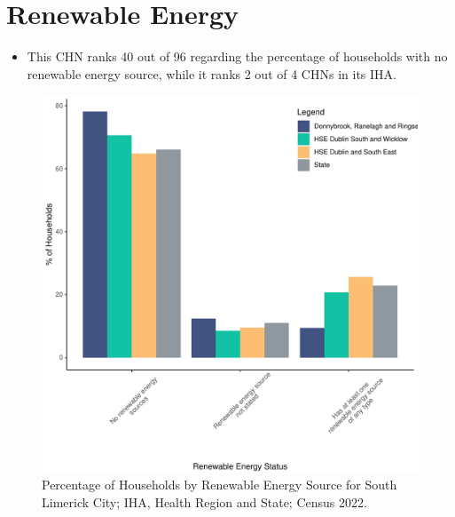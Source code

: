 \documentclass{article}
\begin{document}
\section{Renewable Energy}\label{sect:RE}
\begin{itemize}
\item This CHN ranks  40 out of 96 regarding the percentage of households with no renewable energy source, while it ranks   2 out of 4 CHNs in its IHA.
\end{itemize}
\begin{figure}[H]
	\centering
	\includegraphics[width = 140mm]{../figures/RenewableEnergyED.pdf}
	\caption{Percentage of Households by Renewable Energy Source for South Limerick City; IHA, Health Region and State; Census 2022.}
	\label{fig:vbnv}
	\end{figure}
\end{document}
